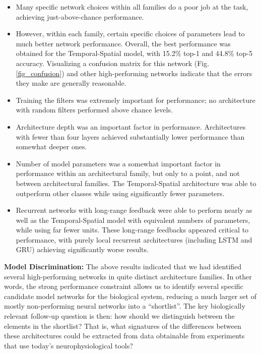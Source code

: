 \begin{itemize}[leftmargin=*,itemsep=0ex,topsep=1ex]
   \item Many specific network choices within all families do a poor job at the task, achieving just-above-chance performance.
   \item However, within each family, certain specific choices of parameters lead to much better network performance.
   Overall, the best performance was obtained for the Temporal-Spatial model, with 15.2\% top-1 and 44.8\% top-5 accuracy.
   Visualizing a confusion matrix for this network (Fig. \ref{fig_confusion})  and other high-performing networks indicate that the errors they make are generally reasonable.
   \item Training the filters was extremely important for performance; no architecture with random filters performed above chance levels.
   \item Architecture depth was an important factor in performance. Architectures with fewer than four layers achieved substantially lower performance than somewhat deeper ones.
   \item Number of model parameters was a somewhat important factor in performance within an architectural family, but only to a point, and not between architectural families.
   The Temporal-Spatial architecture was able to outperform other classes while using significantly fewer parameters.
   \item Recurrent networks with long-range feedback were able to perform nearly as well as the Temporal-Spatial model with equivalent numbers of parameters, while using far fewer units.
   These long-range feedbacks appeared critical to performance, with purely local recurrent architectures (including LSTM and GRU) achieving significantly worse results.
\end{itemize}

\textbf{Model Discrimination:}  The above results indicated that we had identified several high-performing networks in quite distinct architecture families.
In other words, the strong performance constraint allows us to identify several specific candidate model networks for the biological system, reducing a much larger set of mostly non-performing neural networks into a ``shortlist''.
The key biologically relevant follow-up question is then: how should we distinguish between the elements in the shortlist? 
That is, what signatures of the differences between these architectures could be extracted from data obtainable from experiments that use today's neurophysiological tools?

